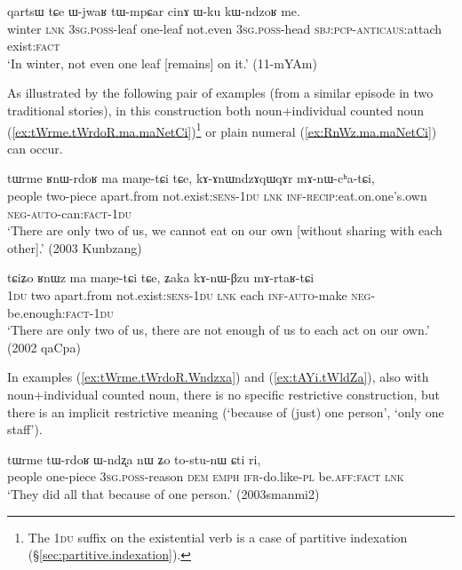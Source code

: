 \begin{exe}
	\ex \label{ex:Wjwaʁ.tWmpCar.cinA}
	\gll   qartsɯ tɕe ɯ-jwaʁ tɯ-mpɕar cinɤ ɯ-ku kɯ-ndzoʁ me.  \\
	winter \textsc{lnk} \textsc{3sg}.\textsc{poss}-leaf one-leaf not.even \textsc{3sg}.\textsc{poss}-head \textsc{sbj}:\textsc{pcp}-\textsc{anticaus}:attach exist:\textsc{fact} \\ 
	\glt `In winter, not even one leaf [remains] on it.' (11-mYAm)
\end{exe} 

As illustrated by the following pair of examples (from a similar episode in two traditional stories), in this construction both noun+individual counted noun  (\ref{ex:tWrme.tWrdoR.ma.maNetCi})\footnote{The \textsc{1du} suffix on the existential verb  is a case of partitive indexation (§\ref{sec:partitive.indexation}). }  or plain numeral (\ref{ex:RnWz.ma.maNetCi}) can occur.

\begin{exe}
	\ex \label{ex:tWrme.tWrdoR.ma.maNetCi}
	\gll tɯrme ʁnɯ-rdoʁ ma maŋe-tɕi tɕe, kɤ-ɤnɯndzɤqɯqɤr mɤ-nɯ-cʰa-tɕi, \\
	people two-piece apart.from not.exist:\textsc{sens}-\textsc{1du} \textsc{lnk} \textsc{inf}-\textsc{recip}:eat.on.one's.own \textsc{neg}-\textsc{auto}-can:\textsc{fact}-\textsc{1du} \\
	\glt `There are only two of us, we cannot eat on our own [without sharing with each other].' (2003 Kunbzang)
\end{exe} 

\begin{exe}
	\ex \label{ex:RnWz.ma.maNetCi}
	\gll  tɕiʑo ʁnɯz ma maŋe-tɕi tɕe, ʑaka kɤ-nɯ-βzu mɤ-rtaʁ-tɕi \\
	\textsc{1du} two apart.from not.exist:\textsc{sens}-\textsc{1du} \textsc{lnk} each \textsc{inf}-\textsc{auto}-make \textsc{neg}-be.enough:\textsc{fact}-\textsc{1du} \\
	\glt  `There are only two of us, there are not enough of us to each act on our own.' (2002 qaCpa)
\end{exe} 

In examples (\ref{ex:tWrme.tWrdoR.Wndzxa}) and (\ref{ex:tAYi.tWldZa}), also with noun+individual counted noun, there is no specific restrictive construction, but there is an implicit restrictive meaning (`because of (just) one person', `only one staff'). 

\begin{exe}
	\ex \label{ex:tWrme.tWrdoR.Wndzxa}
	\gll tɯrme tɯ-rdoʁ ɯ-ndʐa nɯ ʑo to-stu-nɯ ɕti ri, \\
	people one-piece  \textsc{3sg}.\textsc{poss}-reason \textsc{dem} \textsc{emph} \textsc{ifr}-do.like-\textsc{pl} be.\textsc{aff}:\textsc{fact} \textsc{lnk} \\
	\glt `They did all that because of one person.' (2003smanmi2)
\end{exe} 

